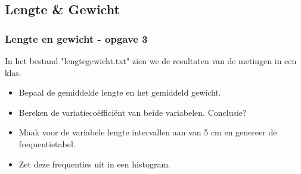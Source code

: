 \documentclass{beamer}
\newif\ifoplossing
\begin{document}
\ifoplossing
	\begin{frame}
		
	\end{frame}

\fi
\subsection{Lengte \& Gewicht}
\begin{frame}
	\frametitle{Lengte en gewicht - opgave 3}
	In het bestand "lengtegewicht.txt" zien we de resultaten van de metingen in een klas.
		\begin{itemize}
			\item Bepaal de gemiddelde lengte en het gemiddeld gewicht.
			\item Bereken de variatiecoëfficiënt van beide variabelen.  Conclusie?
			\item Maak voor de variabele lengte intervallen aan van 5 cm en genereer de frequentietabel.
			\item Zet deze frequenties uit in een histogram.
		\end{itemize}
\end{frame}

\ifoplossing
\begin{frame}[fragile]
	
\end{frame}
\fi
\end{document}
